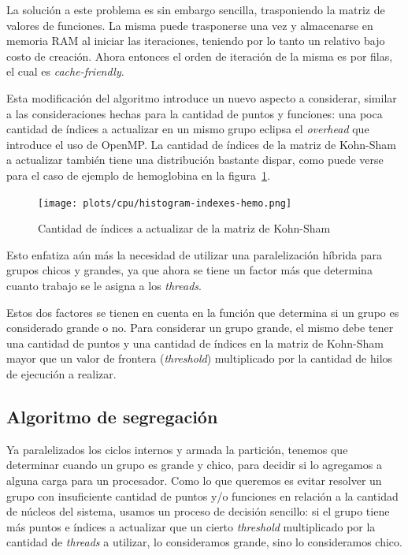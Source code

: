 La soluci\'on a este problema es sin embargo sencilla, trasponiendo la matriz de
valores de funciones. La misma puede trasponerse una vez y almacenarse en memoria
RAM al iniciar las iteraciones, teniendo por lo tanto un relativo bajo costo de
creaci\'on. Ahora entonces el orden de iteraci\'on de la misma es por filas, el
cual es \textit{cache-friendly}.

Esta modificaci\'on del algoritmo introduce un nuevo aspecto a considerar, similar
a las consideraciones hechas para la cantidad de puntos y funciones: una poca
cantidad de \'indices a actualizar en un mismo grupo eclipsa el \textit{overhead}
que introduce el uso de OpenMP. La cantidad de \'indices de la matriz de Kohn-Sham a
actualizar tambi\'en tiene una distribuci\'on bastante dispar, como puede verse
para el caso de ejemplo de hemoglobina en la figura~\ref{fig:histogram-indexes-hemo}.

\begin{figure}[htbp]
   \centering
   \texttt{[image: plots/cpu/histogram-indexes-hemo.png]}
   \caption{Cantidad de \'indices a actualizar de la matriz de Kohn-Sham}
   \label{fig:histogram-indexes-hemo}
\end{figure}

Esto enfatiza a\'un m\'as la necesidad de utilizar una paralelizaci\'on h\'ibrida
para grupos chicos y grandes, ya que ahora se tiene un factor m\'as que determina
cuanto trabajo se le asigna a los \textit{threads}.

Estos dos factores se tienen en cuenta en la funci\'on que determina si un grupo
es considerado grande o no. Para considerar un grupo grande, el mismo debe tener
una cantidad de puntos y una cantidad de \'indices en la matriz de Kohn-Sham mayor que
un valor de frontera (\textit{threshold}) multiplicado por la cantidad de hilos de
ejecuci\'on a realizar.

\subsection{Algoritmo de segregaci\'on}

Ya paralelizados los ciclos internos y armada la partici\'on,  tenemos que determinar
cuando un grupo es grande y chico, para
decidir si lo agregamos a alguna carga para un procesador. Como lo que
queremos es evitar resolver un grupo con insuficiente cantidad de puntos y/o
funciones en relaci\'on a la cantidad de n\'ucleos del sistema, usamos un
proceso de decisi\'on sencillo: si el grupo tiene m\'as puntos e \'indices a
actualizar que un cierto \textit{threshold} multiplicado por la cantidad de
\textit{threads} a utilizar, lo consideramos grande, sino lo consideramos chico.

